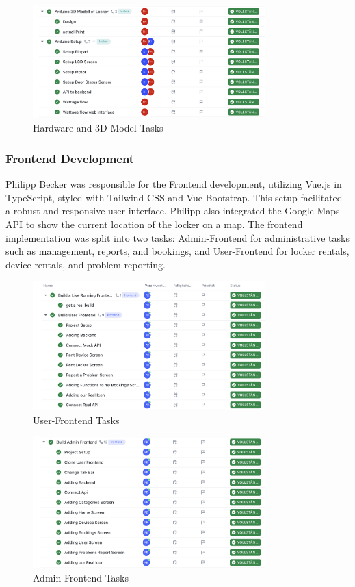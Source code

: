 \begin{figure}[htbp]
    \centering
    \includegraphics[width=0.8\textwidth]{images/hardware and print.png}
    \caption{Hardware and 3D Model Tasks}
    \label{fig:myimage}
\end{figure}
\newpage
\subsubsection{Frontend Development}
Philipp Becker was responsible for the Frontend development, utilizing Vue.js in TypeScript, styled with Tailwind CSS and Vue-Bootstrap. This setup facilitated a robust and responsive user interface. Philipp also integrated the Google Maps API to show the current location of the locker on a map. The frontend implementation was split into two tasks: Admin-Frontend for administrative tasks such as management, reports, and bookings, and User-Frontend for locker rentals, device rentals, and problem reporting.

\begin{figure}[htbp]
    \centering
    \includegraphics[width=0.8\textwidth]{images/user-frontend.png}
    \caption{User-Frontend Tasks}
    \label{fig:user-frontend}
\end{figure}
\begin{figure}[htbp]
    \centering
        \includegraphics[width=0.8\textwidth]{images/admin-frontend.png}
    \caption{Admin-Frontend Tasks}
    \label{fig:admin-frontend}
\end{figure}
\clearpage
